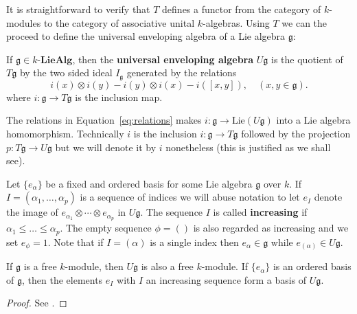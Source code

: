 It is straightforward to verify that $ T $ defines a functor from the category of $ k $-modules to the category of associative unital $ k $-algebras. Using $ T $ we can the proceed to define the universal enveloping algebra of a Lie algebra $ \mathfrak{g} $:

\begin{definition}
  If $ \mathfrak{g} \in k\text{-}\mathbf{LieAlg} $, then the \textbf{universal enveloping algebra} $ U\mathfrak{g} $ is the quotient of $ T\mathfrak{g} $ by the two sided ideal $ I_\mathfrak{g} $ generated by the relations
  \begin{equation}
    i(x) \otimes i(y) - i(y) \otimes i(x) - i([x,y]),\quad (x,y \in \mathfrak{g}).
    \label{eq:relations}
  \end{equation}
  where $ i: \mathfrak{g} \to T\mathfrak{g} $ is the inclusion map.
\end{definition}

The relations in Equation~\ref{eq:relations} makes $ i:\mathfrak{g} \to \text{Lie}(U\mathfrak{g}) $ into a Lie algebra homomorphism. Technically $ i $ is the inclusion $ i: \mathfrak{g} \to T\mathfrak{g} $ followed by the projection $ p: T\mathfrak{g} \to U\mathfrak{g} $ but we will denote it by $ i $ nonetheless (this is justified as we shall see).


Let $ \{e_{\alpha}\} $ be a fixed and ordered basis for some Lie algebra $ \mathfrak{g} $ over $ k $.
If $ I = (\alpha_1, \ldots, \alpha_p) $ is a sequence of indices we will abuse notation to let $ e_I $ denote the image of $ e_{\alpha_1} \otimes \cdots \otimes e_{\alpha_p} $ in $ U\mathfrak{g} $. The sequence $ I $ is called \textbf{increasing} if $ \alpha_1 \leq \ldots \leq \alpha_p $. The empty sequence $ \phi = () $ is also regarded as increasing and we set $ e_\phi = 1 $. Note that if $ I = (\alpha) $ is a single index then $ e_\alpha \in \mathfrak{g} $ while $ e_{(\alpha)} \in U\mathfrak{g} $.

\begin{theorem}
  \label{thm:pbw}
  If $ \mathfrak{g} $ is a free $ k $-module, then $ U\mathfrak{g} $ is also a free $ k $-module. If $ \{e_{\alpha}\} $ is an ordered basis of $ \mathfrak{g} $, then the elements $ e_I $ with $ I $ an increasing sequence form a basis of $ U\mathfrak{g} $.
\end{theorem}
\begin{proof}
  See \cite[V.2]{jacobson1979lie}.
\end{proof}

